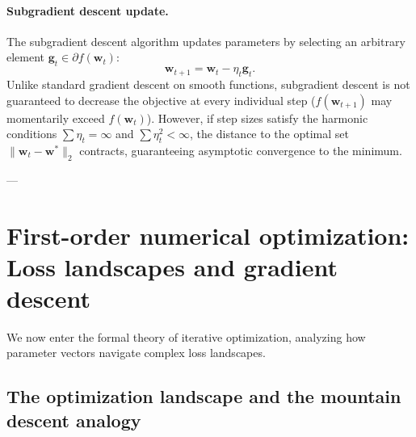 \paragraph{Subgradient descent update.}
The subgradient descent algorithm updates parameters by selecting an arbitrary element $\mathbf{g}_t \in \partial f(\mathbf{w}_t)$:
\begin{equation}
\mathbf{w}_{t+1} = \mathbf{w}_t - \eta_t \mathbf{g}_t.
\label{eq:subgradient_update}
\end{equation}
Unlike standard gradient descent on smooth functions, subgradient descent is not guaranteed to decrease the objective at every individual step ($f(\mathbf{w}_{t+1})$ may momentarily exceed $f(\mathbf{w}_t)$). However, if step sizes satisfy the harmonic conditions $\sum \eta_t = \infty$ and $\sum \eta_t^2 < \infty$, the distance to the optimal set $\|\mathbf{w}_t - \mathbf{w}^*\|_2$ contracts, guaranteeing asymptotic convergence to the minimum.

---

\section{First-order numerical optimization: Loss landscapes and gradient descent}
\label{sec:first_order_optimization}

We now enter the formal theory of iterative optimization, analyzing how parameter vectors navigate complex loss landscapes.

\subsection{The optimization landscape and the mountain descent analogy}
\label{sec:skier_analogy_landscape}

